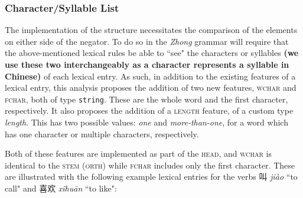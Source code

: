\documentclass[12pt, UTF8]{article}
\begin{document}
%
%
%
%
%
%


\subsubsection{Character/Syllable List}

The implementation of the structure necessitates the comparison of the elements on either side of the negator. To do so in the \textit{Zhong} grammar will require that the above-mentioned lexical rules be able to ``see" the characters or syllables \textbf{(we use these two interchangeably as a character represents a syllable in Chinese)} of each lexical entry. As such, in addition to the existing features of a lexical entry, this analysis proposes the addition of two new features, \textsc{wchar} and \textsc{fchar}, both of type \texttt{string}. These are the whole word and the first character, respectively. It also proposes the addition of a \textsc{length} feature, of a custom type \textit{length}. This has two possible values: \textit{one} and \textit{more-than-one}, for a word which has one character or multiple characters, respectively.

Both of these features are implemented as part of the \textsc{head}, and \textsc{wchar} is identical to the \textsc{stem} (\textsc{orth}) while \textsc{fchar} includes only the first character. These are illustrated with the following example lexical entries for the verbs 叫 \textit{ji\`{a}o} ``to call" and 喜欢 \textit{x\^{i}hu\={a}n} ``to like":
\end{document}
